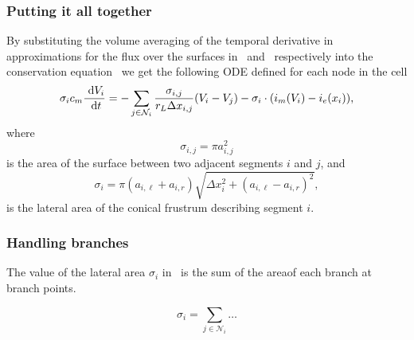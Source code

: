 \subsubsection{Putting it all together}
By substituting the volume averaging of the temporal derivative in~ approximations for the flux over the surfaces in~ and~ respectively into the conservation equation~ we get the following ODE defined for each node in the cell
\begin{equation}
    \sigma_i c_m \frac{~\text{d}{V_i}}{~\text{d}{t}}
       = -\sum_{j\in\mathcal{N}_i} {\frac{\sigma_{i,j}}{r_L \Delta x_{i,j}} (V_i-V_j)} - \sigma_i\cdot(i_m(V_i) - i_e(x_i)),
    \label{eq:ode}
\end{equation}
where
\begin{equation}
    \sigma_{i,j} = \pi a_{i,j}^2
    \label{eq:sigma_ij}
\end{equation}
is the area of the surface between two adjacent segments $i$ and $j$, and
\begin{equation}
    \sigma_{i}   = \pi(a_{i,\ell} + a_{i,r}) \sqrt{\Delta x_i^2 + (a_{i,\ell} - a_{i,r})^2},
    \label{eq:sigma_i}
\end{equation}
is the lateral area of the conical frustrum describing segment $i$.

\subsubsection{Handling branches}
The value of the lateral area $\sigma_i$ in~ is the sum of the areaof each branch at branch points.



\begin{equation}
    \sigma_i = \sum_{j\in\mathcal{N}_i} {\dots}
\end{equation}


